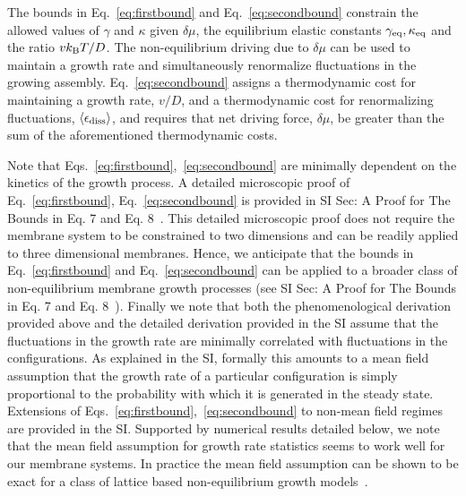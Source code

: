 \documentclass[amsmath,preprintnumbers,10pt,nofootinbib,prl,twocolumn]{revtex4-1}
\begin{document}
The bounds in Eq.~\ref{eq:firstbound} and Eq.~\ref{eq:secondbound} constrain the allowed values of $\gamma$ and $\kappa$ given $\delta \mu$, the equilibrium elastic constants $\gamma_{\rm eq}, \kappa_{\rm eq}$ and the ratio $vk_{\rm B}T/D$. The non-equilibrium driving due to $\delta \mu$ can be used to maintain a growth rate and simultaneously renormalize fluctuations in the growing assembly. Eq.~\ref{eq:secondbound} assigns a thermodynamic cost for maintaining a growth rate, $v/D$, and a thermodynamic cost for renormalizing fluctuations, $\langle \epsilon_{\rm diss}\rangle$, and requires that net driving force, $\delta \mu$, be greater than the sum of the aforementioned thermodynamic costs. 

Note that Eqs.~\ref{eq:firstbound},~\ref{eq:secondbound} are minimally dependent on the kinetics of the growth process. A detailed microscopic proof of Eq.~\ref{eq:firstbound}, Eq.~\ref{eq:secondbound} is provided in SI Sec: A Proof for The Bounds in Eq. 7 and Eq. 8~\cite{Supplementary}. This detailed microscopic proof does not require the membrane system to be constrained to two dimensions and can be readily applied to three dimensional membranes. Hence, we anticipate that the bounds in Eq.~\ref{eq:firstbound} and Eq.~\ref{eq:secondbound} can be applied to a broader class of non-equilibrium membrane growth processes (see SI Sec: A Proof for The Bounds in Eq. 7 and Eq. 8~\cite{Supplementary}). Finally we note that both the phenomenological derivation provided above and the detailed derivation provided in the SI assume that the fluctuations in the growth rate are minimally correlated with fluctuations in the configurations. As explained in the SI, formally this amounts to a mean field assumption that the growth rate of a particular configuration is simply proportional to the probability with which it is generated in the steady state. Extensions of Eqs.~\ref{eq:firstbound},~\ref{eq:secondbound} to non-mean field regimes are provided in the SI. Supported by numerical results detailed below, we note that the mean field assumption for growth rate statistics seems to work well for our membrane systems. In practice the mean field assumption can be shown to be exact for a class of lattice based non-equilibrium growth models~\cite{Nguyen2016}. 
\end{document}
